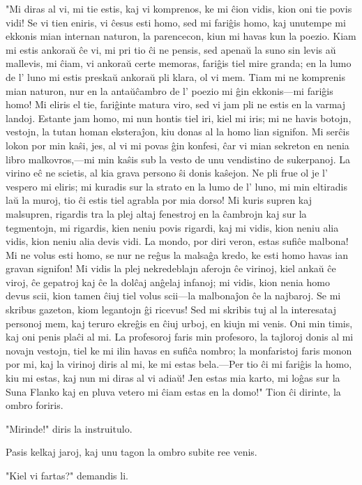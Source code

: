 \documentclass[ngerman,12pt,twoside]{book}
\begin{document}
"Mi diras al vi, mi tie estis, kaj vi komprenos, ke mi ĉion vidis, kion oni tie povis vidi! Se vi tien eniris, vi ĉesus esti homo, sed mi fariĝis homo, kaj unutempe mi ekkonis mian internan naturon, la parencecon, kiun mi havas kun la poezio. Kiam mi estis ankoraŭ ĉe vi, mi pri tio ĉi ne pensis, sed apenaŭ la suno sin levis aŭ mallevis, mi ĉiam, vi ankoraŭ certe memoras, fariĝis tiel mire granda; en la lumo de l' luno mi estis preskaŭ ankoraŭ pli klara, ol vi mem. Tiam mi ne komprenis mian naturon, nur en la antaŭĉambro de l' poezio mi ĝin ekkonis---mi fariĝis homo! Mi eliris el tie, fariĝinte matura viro, sed vi jam pli ne estis en la varmaj landoj. Estante jam homo, mi nun hontis tiel iri, kiel mi iris; mi ne havis botojn, vestojn, la tutan homan eksteraĵon, kiu donas al la homo lian signifon. Mi serĉis lokon por min kaŝi, jes, al vi mi povas ĝin konfesi, ĉar vi mian sekreton en nenia libro malkovros,---mi min kaŝis sub la vesto de unu vendistino de sukerpanoj. La virino eĉ ne scietis, al kia grava persono ŝi donis kaŝejon. Ne pli frue ol je l' vespero mi eliris; mi kuradis sur la strato en la lumo de l' luno, mi min eltiradis laŭ la muroj, tio ĉi estis tiel agrabla por mia dorso! Mi kuris supren kaj malsupren, rigardis tra la plej altaj fenestroj en la ĉambrojn kaj sur la tegmentojn, mi rigardis, kien neniu povis rigardi, kaj mi vidis, kion neniu alia vidis, kion neniu alia devis vidi. La mondo, por diri veron, estas sufiĉe malbona! Mi ne volus esti homo, se nur ne reĝus la malsaĝa kredo, ke esti homo havas ian gravan signifon! Mi vidis la plej nekredeblajn aferojn ĉe virinoj, kiel ankaŭ ĉe viroj, ĉe gepatroj kaj ĉe la dolĉaj anĝelaj infanoj; mi vidis, kion nenia homo devus scii, kion tamen ĉiuj tiel volus scii---la malbonaĵon ĉe la najbaroj. Se mi skribus gazeton, kiom legantojn ĝi ricevus! Sed mi skribis tuj al la interesataj personoj mem, kaj teruro ekreĝis en ĉiuj urboj, en kiujn mi venis. Oni min timis, kaj oni penis plaĉi al mi. La profesoroj faris min profesoro, la tajloroj donis al mi novajn vestojn, tiel ke mi ilin havas en sufiĉa nombro; la monfaristoj faris monon por mi, kaj la virinoj diris al mi, ke mi estas bela.---Per tio ĉi mi fariĝis la homo, kiu mi estas, kaj nun mi diras al vi adiaŭ! Jen estas mia karto, mi loĝas sur la Suna Flanko kaj en pluva vetero mi ĉiam estas en la domo!" Tion ĉi dirinte, la ombro foriris.

"Mirinde!" diris la instruitulo.

Pasis kelkaj jaroj, kaj unu tagon la ombro subite ree venis.

"Kiel vi fartas?" demandis li.
\end{document}
